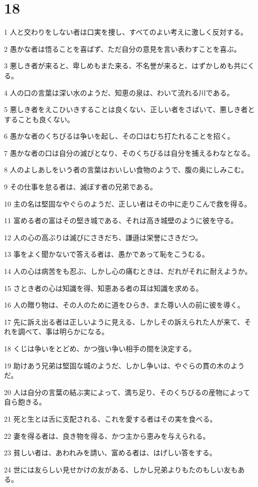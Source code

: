 \chapter{18}

\par 1 人と交わりをしない者は口実を捜し、すべてのよい考えに激しく反対する。
\par 2 愚かな者は悟ることを喜ばず、ただ自分の意見を言い表わすことを喜ぶ。
\par 3 悪しき者が来ると、卑しめもまた来る、不名誉が来ると、はずかしめも共にくる。
\par 4 人の口の言葉は深い水のようだ、知恵の泉は、わいて流れる川である。
\par 5 悪しき者をえこひいきすることは良くない、正しい者をさばいて、悪しき者とすることも良くない。
\par 6 愚かな者のくちびるは争いを起し、その口はむち打たれることを招く。
\par 7 愚かな者の口は自分の滅びとなり、そのくちびるは自分を捕えるわなとなる。
\par 8 人のよしあしをいう者の言葉はおいしい食物のようで、腹の奥にしみこむ。
\par 9 その仕事を怠る者は、滅ぼす者の兄弟である。
\par 10 主の名は堅固なやぐらのようだ、正しい者はその中に走りこんで救を得る。
\par 11 富める者の富はその堅き城である、それは高き城壁のように彼を守る。
\par 12 人の心の高ぶりは滅びにさきだち、謙遜は栄誉にさきだつ。
\par 13 事をよく聞かないで答える者は、愚かであって恥をこうむる。
\par 14 人の心は病苦をも忍ぶ、しかし心の痛むときは、だれがそれに耐えようか。
\par 15 さとき者の心は知識を得、知恵ある者の耳は知識を求める。
\par 16 人の贈り物は、その人のために道をひらき、また尊い人の前に彼を導く。
\par 17 先に訴え出る者は正しいように見える、しかしその訴えられた人が来て、それを調べて、事は明らかになる。
\par 18 くじは争いをとどめ、かつ強い争い相手の間を決定する。
\par 19 助けあう兄弟は堅固な城のようだ、しかし争いは、やぐらの貫の木のようだ。
\par 20 人は自分の言葉の結ぶ実によって、満ち足り、そのくちびるの産物によって自ら飽きる。
\par 21 死と生とは舌に支配される、これを愛する者はその実を食べる。
\par 22 妻を得る者は、良き物を得る、かつ主から恵みを与えられる。
\par 23 貧しい者は、あわれみを請い、富める者は、はげしい答をする。
\par 24 世には友らしい見せかけの友がある、しかし兄弟よりもたのもしい友もある。

